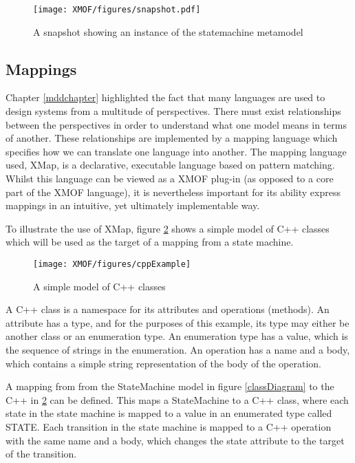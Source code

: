 \begin{figure}[htb]
\begin{center}
\texttt{[image: XMOF/figures/snapshot.pdf]}
\caption{A snapshot showing an instance of the statemachine metamodel}
\label{snapshotExample}
\end{center}
\end{figure}

\subsection{Mappings}

Chapter \ref{mddchapter} highlighted the fact that many languages
are used to design systems from a multitude of perspectives. There
must exist relationships between the perspectives in order to
understand what one model means in terms of another.  These
relationships are implemented by a mapping language which
specifies how we can translate one language into another.  The
mapping language used, XMap, is a declarative, executable language
based on pattern matching. Whilst this language can be viewed as a
XMOF plug-in (as opposed to a core part of the XMOF language), it
is nevertheless important for its ability express mappings in an
intuitive, yet ultimately implementable way.

To illustrate the use of XMap, figure \ref{cppExample} shows a
simple model of {C++} classes which will be used as the target of a
mapping from a state machine.

\begin{figure}[htb]
\begin{center}
\texttt{[image: XMOF/figures/cppExample]}
\caption{A simple model of C++ classes}
\label{cppExample}
\end{center}
\end{figure}

A {C++} class is a namespace for its attributes and operations
(methods). An attribute has a type, and for the purposes of this
example, its type may either be another class or an enumeration
type. An enumeration type has a value, which is the sequence of
strings in the enumeration. An operation has a name and a body,
which contains a simple string representation of the body of the
operation.

A mapping from from the StateMachine model in figure
\ref{classDiagram} to the {C++} in \ref{cppExample} can be
defined. This maps a StateMachine to a {C++} class, where each
state in the state machine is mapped to a value in an enumerated
type called STATE. Each transition in the state machine is mapped
to a {C++} operation with the same name and a body, which changes
the state attribute to the target of the transition.

